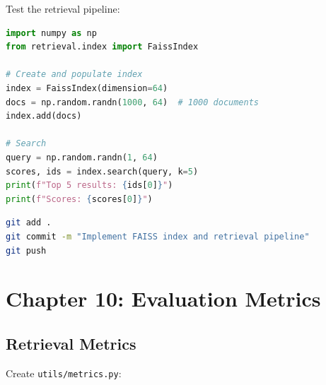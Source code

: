 \documentclass[12pt,a4paper]{article}
\begin{document}
\begin{checkpoint}
Test the retrieval pipeline:
\begin{lstlisting}[language=Python]
import numpy as np
from retrieval.index import FaissIndex

# Create and populate index
index = FaissIndex(dimension=64)
docs = np.random.randn(1000, 64)  # 1000 documents
index.add(docs)

# Search
query = np.random.randn(1, 64)
scores, ids = index.search(query, k=5)
print(f"Top 5 results: {ids[0]}")
print(f"Scores: {scores[0]}")
\end{lstlisting}
\end{checkpoint}

\begin{gitcommit}
\begin{lstlisting}[language=bash]
git add .
git commit -m "Implement FAISS index and retrieval pipeline"
git push
\end{lstlisting}
\end{gitcommit}

\section{Chapter 10: Evaluation Metrics}

\subsection{Retrieval Metrics}

Create \texttt{utils/metrics.py}:
\end{document}
